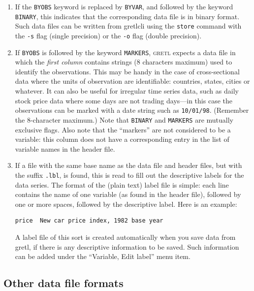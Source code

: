\documentclass{article}
\begin{document}
\begin{enumerate}
\item If the \texttt{BYOBS} keyword is replaced by \texttt{BYVAR}, and
  followed by the keyword \texttt{BINARY}, this indicates that the
  corresponding data file is in binary format.  Such data files can be
  written from \textsf{gretlcli} using the \texttt{store} command with
  the \texttt{-s} flag (single precision) or the \texttt{-o} flag
  (double precision). 
\item If \texttt{BYOBS} is followed by the keyword \texttt{MARKERS},
  \textsc{gretl} expects a data file in which the \textit{first
    column} contains strings (8 characters maximum) used to identify
  the observations.  This may be handy in the case of cross-sectional
  data where the units of observation are identifiable: countries,
  states, cities or whatever.  It can also be useful for irregular
  time series data, such as daily stock price data where some days are
  not trading days---in this case the observations can be marked with
  a date string such as \texttt{10/01/98}.  (Remember the 8-character
  maximum.)  Note that \texttt{BINARY} and \texttt{MARKERS} are
  mutually exclusive flags.  Also note that the ``markers'' are not
  considered to be a variable: this column does not have a
  corresponding entry in the list of variable names in the header
  file.
\item If a file with the same base name as the data file and header
  files, but with the suffix \texttt{.lbl}, is found, this is read to
  fill out the descriptive labels for the data series.  The format of
  the (plain text) label file is simple: each line contains the name
  of one variable (as found in the header file), followed by one or
  more spaces, followed by the descriptive label.  Here is an example:

\begin{verbatim}
price  New car price index, 1982 base year
\end{verbatim}
  
  A label file of this sort is created automatically when you save
  data from \textsf{gretl}, if there is any descriptive information to
  be saved.  Such information can be added under the ``Variable, Edit
  label'' menu item.

\end{enumerate}

\subsection{Other data file formats}
\label{csvetc}
\end{document}
